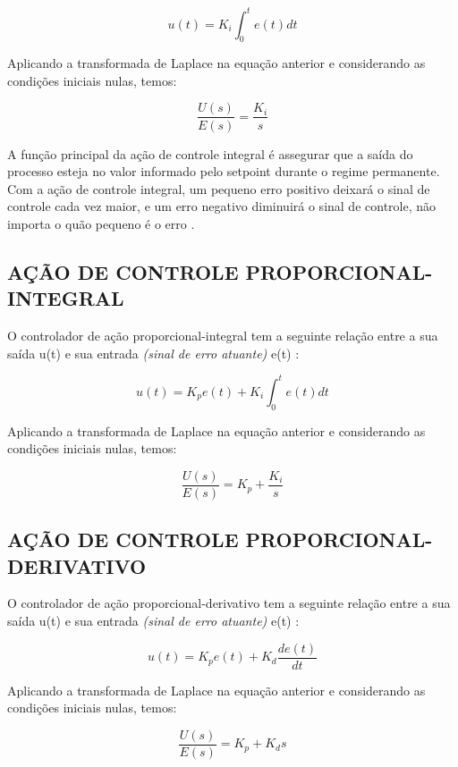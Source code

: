 \documentclass[12pt,oneside,a4paper, chapter=TITLE, section = TITLE, english, brazil]{abntex2}
\begin{document}
$$u(t) = K_{i} \int^{t}_0 e(t)dt$$

Aplicando a transformada de Laplace na equação anterior e considerando as condições iniciais nulas, temos:

\begin{equation}
\frac{U(s)}{E(s)} = \frac{K_{i}}{s} \label{eq:g_s_cont_integ}
\end{equation}

A função principal da ação de controle integral é assegurar que a saída do processo esteja no valor informado pelo setpoint durante o regime permanente. Com a ação de controle integral, um pequeno erro positivo deixará o sinal de controle cada vez maior, e um erro negativo diminuirá o sinal de controle, não importa o quão pequeno é o erro \cite{astrom}.

\subsection{AÇÃO DE CONTROLE PROPORCIONAL-INTEGRAL} %

O controlador de ação proporcional-integral tem a seguinte relação entre a sua saída u(t) e sua entrada \textit{(sinal de erro atuante)} e(t) \cite{ogata}:

$$u(t) = K_{p}e(t) + K_{i} \int^{t}_0 e(t)dt$$

Aplicando a transformada de Laplace na equação anterior e considerando as condições iniciais nulas, temos:

\begin{equation}
\frac{U(s)}{E(s)} = K_{p} + \frac{K_{i}}{s} \label{eq:g_s_cont_prop_integ}
\end{equation}

\subsection{AÇÃO DE CONTROLE PROPORCIONAL-DERIVATIVO} %

O controlador de ação proporcional-derivativo tem a seguinte relação entre a sua saída u(t) e sua entrada \textit{(sinal de erro atuante)} e(t) \cite{ogata}:

$$u(t) = K_{p}e(t) + K_{d}\frac{de(t)}{dt}$$

Aplicando a transformada de Laplace na equação anterior e considerando as condições iniciais nulas, temos:

\begin{equation}
\frac{U(s)}{E(s)} = K_{p} + K_{d}s \label{eq:g_s_cont_prop_deriv}
\end{equation}
\end{document}
